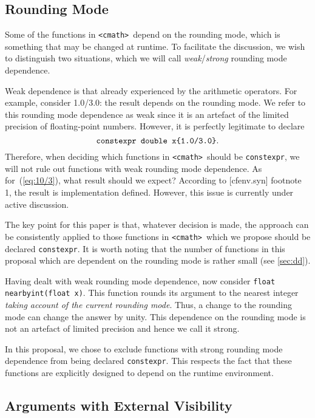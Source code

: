 \documentclass[prd,twocolumn,amsmath,amssymb,nofootinbib,eqsecnum]{revtex4-1}
\newcommand{\constexpr}{\code{constexpr}\xspace}
\newcommand{\code}[1]{{\tt #1}}
\newcommand{\header}[1]{{\tt <#1>}}
\newcommand{\cmath}{\header{cmath}}
\newcommand{\eq}[1]{(\ref{eq:#1})}
\begin{document}
\subsection{Rounding Mode}
\label{sec:rounding}

Some of the functions in \cmath\ depend on the rounding mode, which is something that may be changed at runtime. To facilitate the discussion, we wish to distinguish two situations, which we will call \emph{weak}/\emph{strong} rounding mode dependence. 

Weak dependence is that already experienced by the arithmetic operators. For example, consider 1.0/3.0: the result depends on the rounding mode. We refer to this rounding mode dependence as weak since it is an artefact of the limited precision of floating-point numbers. However, it is perfectly legitimate to declare
\begin{equation}
	\mbox{\code{constexpr double x\{1.0/3.0\}}}.
\label{eq:10/3}
\end{equation}
Therefore, when deciding which functions in \cmath\ should be \constexpr, we will not rule out functions with weak rounding mode dependence.
As for~\eq{10/3}, what result should we expect? According to [cfenv.syn] footnote 1, the result is implementation defined. However, this issue is currently under active discussion. 

The key point for this paper is that, whatever decision is made, the approach can be consistently applied to those functions in \cmath\ which we propose should be declared \constexpr. It is worth noting that the number of functions in this proposal which are dependent on the rounding mode is rather small (see \ref{sec:dd}).

Having dealt with weak rounding mode dependence, now consider \code{float nearbyint(float x)}. This function rounds its argument to the nearest integer \emph{taking account of the current rounding mode}. Thus, a change to the rounding mode can change the answer by unity. This dependence on the rounding mode is not an artefact of limited precision and hence we call it strong.

In this proposal, we chose to exclude functions with strong rounding mode dependence from being declared \constexpr. This respects the fact that these functions are explicitly designed to depend on the runtime environment.

\subsection{Arguments with External Visibility}
\label{sec:external}
\end{document}
